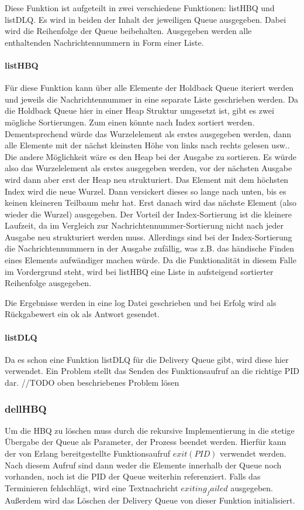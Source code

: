 Diese Funktion ist aufgeteilt in zwei verschiedene Funktionen: listHBQ und listDLQ. 
Es wird in beiden der Inhalt der jeweiligen Queue ausgegeben. Dabei wird die Reihenfolge der Queue beibehalten. Ausgegeben werden alle enthaltenden Nachrichtennummern in Form einer Liste. 

\paragraph{listHBQ}
Für diese Funktion kann über alle Elemente der Holdback Queue iteriert werden und jeweils die Nachrichtennummer in eine separate Liste geschrieben werden. 
Da die Holdback Queue hier in einer Heap Struktur umgesetzt ist, gibt es zwei mögliche Sortierungen. Zum einen könnte nach Index sortiert werden. Dementsprechend würde das Wurzelelement als erstes ausgegeben werden, dann alle Elemente mit der nächst kleinsten Höhe von links nach rechts gelesen usw..
Die andere Möglichkeit wäre es den Heap bei der Ausgabe zu sortieren. Es würde also das Wurzelelement als erstes ausgegeben werden, vor der nächsten Ausgabe wird dann aber erst der Heap neu strukturiert. Das Element mit dem höchsten Index wird die neue Wurzel. Dann versickert dieses so lange nach unten, bis es keinen kleineren Teilbaum mehr hat. Erst danach wird das nächste Element (also wieder die Wurzel) ausgegeben. 
Der Vorteil der Index-Sortierung ist die kleinere Laufzeit, da im Vergleich zur Nachrichtennummer-Sortierung nicht nach jeder Ausgabe neu strukturiert werden muss. Allerdings sind bei der Index-Sortierung die Nachrichtennummern in der Ausgabe zufällig, was z.B. das händische Finden eines Elements aufwändiger machen würde. 
Da die Funktionalität in diesem Falle im Vordergrund steht, wird bei listHBQ eine Liste in aufsteigend sortierter Reihenfolge ausgegeben. 

Die Ergebnisse werden in eine log Datei geschrieben und bei Erfolg wird als Rückgabewert ein ok als Antwort gesendet.

\paragraph{listDLQ}
Da es schon eine Funktion listDLQ für die Delivery Queue gibt, wird diese hier verwendet. Ein Problem stellt das Senden des Funktionsaufruf an die richtige PID dar. 
//TODO oben beschriebenes Problem lösen

\subsubsection{dellHBQ}

Um die HBQ zu löschen muss durch die rekursive Implementierung in die stetige Übergabe der Queue als Parameter, der Prozess beendet werden. Hierfür kann der von Erlang bereitgestellte Funktionsaufruf $exit(PID)$ verwendet werden. Nach diesem Aufruf sind dann weder die Elemente innerhalb der Queue noch vorhanden, noch ist die PID der Queue weiterhin referenziert. Falls das Terminieren fehlschlägt, wird eine Textnachricht $exiting_failed$ ausgegeben. 
Außerdem wird das Löschen der Delivery Queue von dieser Funktion initialisiert. 